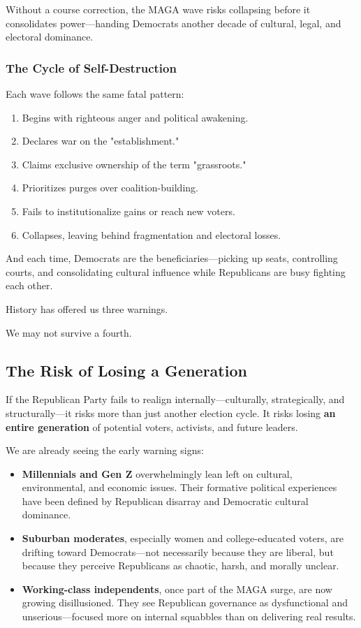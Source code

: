 Without a course correction, the MAGA wave risks collapsing before it consolidates power—handing Democrats another decade of cultural, legal, and electoral dominance.

\subsubsection{The Cycle of Self-Destruction}
Each wave follows the same fatal pattern:
\begin{enumerate}
\item Begins with righteous anger and political awakening.
\item Declares war on the "establishment."
\item Claims exclusive ownership of the term "grassroots."
\item Prioritizes purges over coalition-building.
\item Fails to institutionalize gains or reach new voters.
\item Collapses, leaving behind fragmentation and electoral losses.
\end{enumerate}

And each time, Democrats are the beneficiaries—picking up seats, controlling courts, and consolidating cultural influence while Republicans are busy fighting each other.

History has offered us three warnings.

We may not survive a fourth.

\subsection{The Risk of Losing a Generation}

If the Republican Party fails to realign internally—culturally, strategically, and structurally—it risks more than just another election cycle. It risks losing \textbf{an entire generation} of potential voters, activists, and future leaders.

We are already seeing the early warning signs:

\begin{itemize}
\item \textbf{Millennials and Gen Z} overwhelmingly lean left on cultural, environmental, and economic issues. Their formative political experiences have been defined by Republican disarray and Democratic cultural dominance.
\item \textbf{Suburban moderates}, especially women and college-educated voters, are drifting toward Democrats—not necessarily because they are liberal, but because they perceive Republicans as chaotic, harsh, and morally unclear.
\item \textbf{Working-class independents}, once part of the MAGA surge, are now growing disillusioned. They see Republican governance as dysfunctional and unserious—focused more on internal squabbles than on delivering real results.
\end{itemize}


